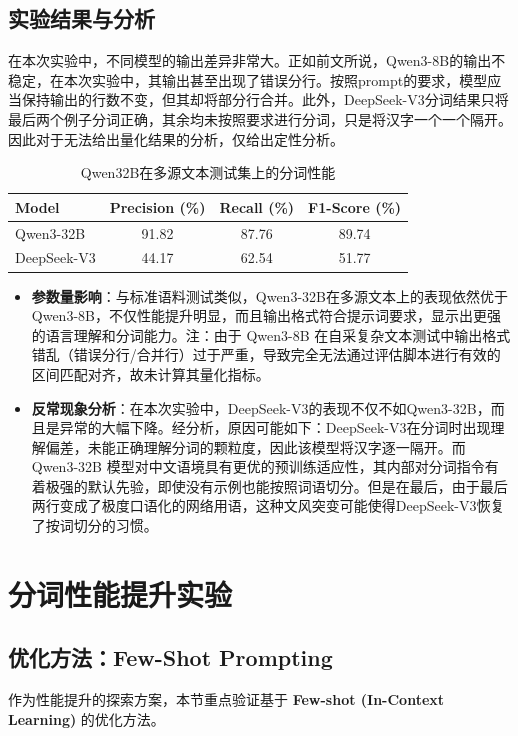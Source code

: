 \documentclass[11pt]{article}
\begin{document}
\subsection{实验结果与分析}
在本次实验中，不同模型的输出差异非常大。正如前文所说，Qwen3-8B的输出不稳定，在本次实验中，其输出甚至出现了错误分行。按照prompt的要求，模型应当保持输出的行数不变，但其却将部分行合并。此外，DeepSeek-V3分词结果只将最后两个例子分词正确，其余均未按照要求进行分词，只是将汉字一个一个隔开。因此对于无法给出量化结果的分析，仅给出定性分析。
\begin{table}[H]
    \centering
    \caption{Qwen32B在多源文本测试集上的分词性能}
    \label{tab:multi_source_result}
    \begin{tabular}{l c c c}
        \toprule
        \textbf{Model} & \textbf{Precision (\%)} & \textbf{Recall (\%)} & \textbf{F1-Score (\%)} \\
        \midrule
        Qwen3-32B     & 91.82& 87.76 & 89.74 \\
        DeepSeek-V3   & 44.17 & 62.54& 51.77 \\
        \bottomrule
    \end{tabular}
\end{table}
\begin{itemize}
    \item \textbf{参数量影响}：与标准语料测试类似，Qwen3-32B在多源文本上的表现依然优于Qwen3-8B，不仅性能提升明显，而且输出格式符合提示词要求，显示出更强的语言理解和分词能力。注：由于 Qwen3-8B 在自采复杂文本测试中输出格式错乱（错误分行/合并行）过于严重，导致完全无法通过评估脚本进行有效的区间匹配对齐，故未计算其量化指标。
    \item \textbf{反常现象分析}：在本次实验中，DeepSeek-V3的表现不仅不如Qwen3-32B，而且是异常的大幅下降。经分析，原因可能如下：DeepSeek-V3在分词时出现理解偏差，未能正确理解分词的颗粒度，因此该模型将汉字逐一隔开。而Qwen3-32B 模型对中文语境具有更优的预训练适应性，其内部对分词指令有着极强的默认先验，即使没有示例也能按照词语切分。但是在最后，由于最后两行变成了极度口语化的网络用语，这种文风突变可能使得DeepSeek-V3恢复了按词切分的习惯。
\end{itemize}

\section{分词性能提升实验}
\subsection{优化方法：Few-Shot Prompting}
作为性能提升的探索方案，本节重点验证基于 \textbf{Few-shot (In-Context Learning)} 的优化方法。
\end{document}

